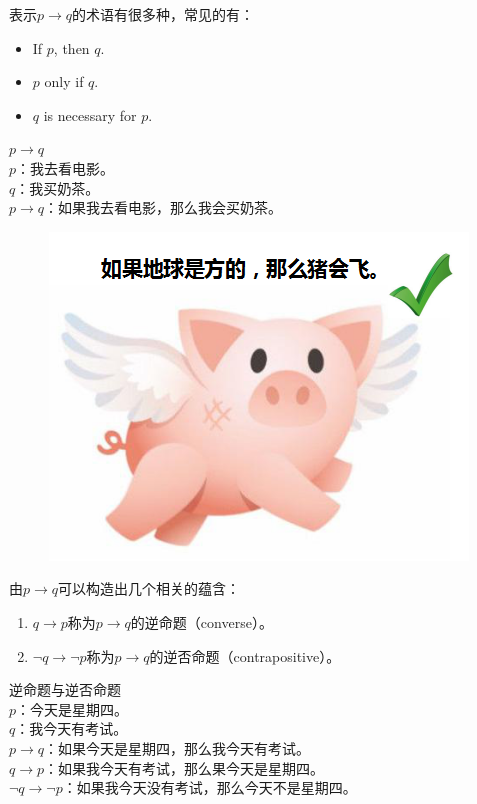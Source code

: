\documentclass[12pt, openany, oneside]{book}
\begin{document}
表示$ p \rightarrow q $的术语有很多种，常见的有：

\begin{itemize}
	\item If $ p $, then $ q $.
	\item $ p $ only if $ q $.
	\item $ q $ is necessary for $ p $.
\end{itemize}

\begin{tcolorbox}
	$ p \rightarrow q $\\
	$ p $：我去看电影。\\
	$ q $：我买奶茶。\\
	$ p \rightarrow q $：如果我去看电影，那么我会买奶茶。
\end{tcolorbox}

\begin{figure}[H]
	\centering
	\includegraphics[scale=0.7]{img/C1/1-2/1.png}
\end{figure}

由$ p \rightarrow q $可以构造出几个相关的蕴含：

\begin{enumerate}
	\item $ q \rightarrow p $称为$ p \rightarrow q $的逆命题（converse）。
	\item $ \neg q \rightarrow \neg p $称为$ p \rightarrow q $的逆否命题（contrapositive）。
\end{enumerate}

\begin{tcolorbox}
	逆命题与逆否命题\\
	$ p $：今天是星期四。\\
	$ q $：我今天有考试。\\
	$ p \rightarrow q $：如果今天是星期四，那么我今天有考试。\\
	$ q \rightarrow p $：如果我今天有考试，那么果今天是星期四。\\
	$ \neg q \rightarrow \neg p $：如果我今天没有考试，那么今天不是星期四。
\end{tcolorbox}
\end{document}
